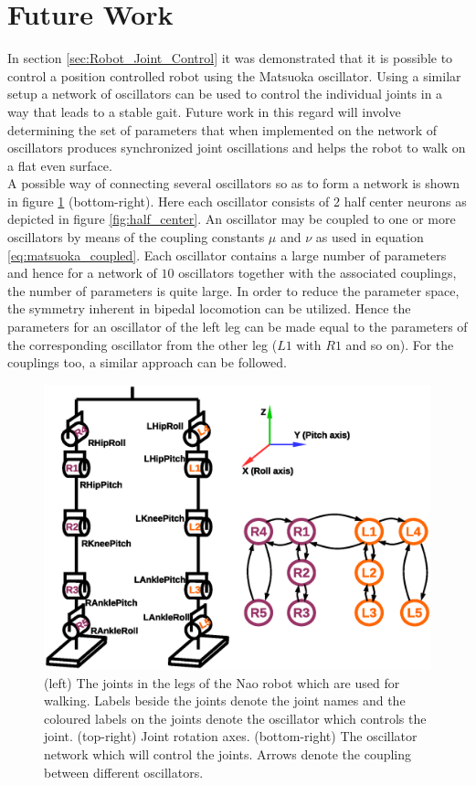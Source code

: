 \documentclass[12pt,twoside]{article}
\theoremstyle{plain}
\theoremstyle{definition}
\theoremstyle{remark}
\newcommand{\forceindent}{\leavevmode{\parindent=2em\indent}}
\begin{document}
\section{Future Work}
\label{sec:Future_Work}
In section \ref{sec:Robot_Joint_Control} it was demonstrated that it is possible to control a position controlled robot using the Matsuoka oscillator. Using a similar setup a network of oscillators can be used to control the individual joints in a way that leads to a stable gait. Future work in this regard will involve determining the set of parameters that when implemented on the network of oscillators produces synchronized joint oscillations and helps the robot to walk on a flat even surface.\\
\forceindent A possible way of connecting several oscillators so as to form a network is shown in figure \ref{fig:future_work} (bottom-right). Here each oscillator consists of 2 half center neurons as depicted in figure \ref{fig:half_center}. An oscillator may be coupled to one or more oscillators by means of the coupling constants $\mu$ and $\nu$ as used in equation \ref{eq:matsuoka_coupled}. Each oscillator contains a large number of parameters and hence for a network of $10$ oscillators together with the associated couplings, the number of parameters is quite large. In order to reduce the parameter space, the symmetry inherent in bipedal locomotion can be utilized. Hence the parameters for an oscillator of the left leg can be made equal to the parameters of the corresponding oscillator from the other leg ($L1$ with $R1$ and so on). For the couplings too, a similar approach can be followed.

\begin{figure}[hbtp]
\centering
\includegraphics[scale=0.5]{figures/future_work_oscillator_network.eps}
\caption{(left) The joints in the legs of the Nao robot which are used for walking. Labels beside the joints denote the joint names and the coloured labels on the joints denote the oscillator which controls the joint. (top-right) Joint rotation axes. (bottom-right) The oscillator network which will  control the joints. Arrows denote the coupling between different oscillators.}
\label{fig:future_work}
\end{figure}
\end{document}
